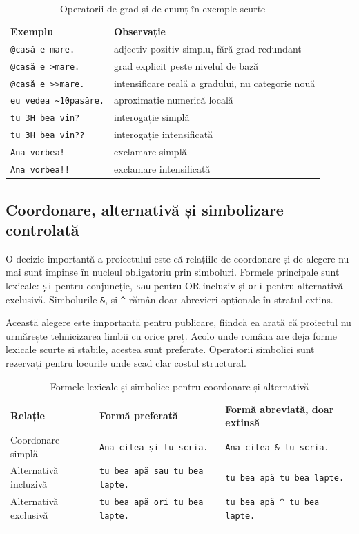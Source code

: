 \documentclass[12pt,onecolumn,letterpaper]{article}
\newcommand{\rs}[1]{\texttt{#1}}
\newcommand{\RStablelayout}{%
\footnotesize
\setlength{\tabcolsep}{6pt}%
\renewcommand{\arraystretch}{1.12}%
\arrayrulecolor{RSRule}%
}
\begin{document}
\begin{table}[h!]
\centering
\RStablelayout
\begin{tabularx}{\linewidth}{@{}lY@{}}
\textbf{Exemplu} & \textbf{Observație} \\
\rs{@casă e mare.} & adjectiv pozitiv simplu, fără grad redundant \\
\rs{@casă e >mare.} & grad explicit peste nivelul de bază \\
\rs{@casă e >>mare.} & intensificare reală a gradului, nu categorie nouă \\
\rs{eu vedea \textasciitilde10pasăre.} & aproximație numerică locală \\
\rs{tu 3H bea vin?} & interogație simplă \\
\rs{tu 3H bea vin??} & interogație intensificată \\
\rs{Ana vorbea!} & exclamare simplă \\
\rs{Ana vorbea!!} & exclamare intensificată \\
\bottomrule
\end{tabularx}
\caption{Operatorii de grad și de enunț în exemple scurte}
\end{table}

\subsection{Coordonare, alternativă și simbolizare controlată}

O decizie importantă a proiectului este că relațiile de coordonare și de alegere
nu mai sunt împinse în nucleul obligatoriu prin simboluri. Formele principale sunt
lexicale: \rs{și} pentru conjuncție, \rs{sau} pentru OR incluziv și \rs{ori}
pentru alternativă exclusivă. Simbolurile \rs{\&}, \rs{\textbar{}} și
\rs{\textasciicircum{}} rămân doar abrevieri opționale în stratul extins.

Această alegere este importantă pentru publicare, fiindcă ea arată că proiectul
nu urmărește tehnicizarea limbii cu orice preț. Acolo unde româna are deja forme
lexicale scurte și stabile, acestea sunt preferate. Operatorii simbolici sunt
rezervați pentru locurile unde scad clar costul structural.

\begin{longtable}{@{}p{3.6cm}p{4.2cm}p{4.4cm}@{}}
\rowcolor{RSGray}
\textbf{Relație} & \textbf{Formă preferată} & \textbf{Formă abreviată, doar extinsă} \\
Coordonare simplă & \rs{Ana citea și tu scria.} & \rs{Ana citea \& tu scria.} \\
Alternativă incluzivă & \rs{tu bea apă sau tu bea lapte.} & \rs{tu bea apă \textbar{} tu bea lapte.} \\
Alternativă exclusivă & \rs{tu bea apă ori tu bea lapte.} & \rs{tu bea apă \textasciicircum{} tu bea lapte.} \\
\bottomrule
\caption{Formele lexicale și simbolice pentru coordonare și alternativă}
\end{longtable}
\end{document}
